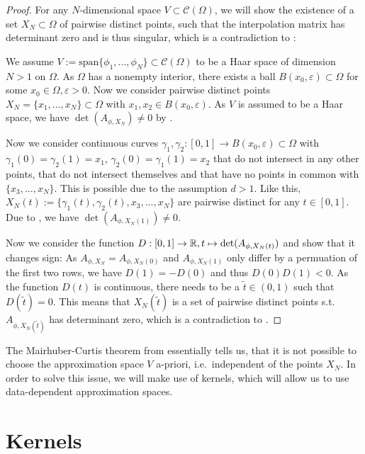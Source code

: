 \begin{proof}
For any $N$-dimensional space $V \subset \mathcal{C}(\Omega)$, we will show the existence of a set $X_N \subset \Omega$ of pairwise distinct points, 
such that the interpolation matrix has determinant zero and is thus singular, 
which is a contradiction to :

We assume $V:= \mathrm{span} \{ \phi_1, ..., \phi_N \} \subset \mathcal{C}(\Omega)$ to be a Haar space of dimension $N > 1$ on $\Omega$.
As $\Omega$ has a nonempty interior, there exists a ball $B(x_0, \varepsilon) \subset \Omega$ for some $x_0 \in \Omega, \varepsilon > 0$.
Now we consider pairwise distinct points $X_N = \{ x_1, ..., x_N \} \subset \Omega$ with $x_1, x_2 \in B(x_0, \varepsilon)$.
As $V$ is assumed to be a Haar space, we have $\det(A_{\phi, X_N}) \neq 0$ by . 

Now we consider continuous curves $\gamma_1, \gamma_2: [0, 1] \rightarrow B(x_0, \varepsilon) \subset \Omega$ with $\gamma_1(0) = \gamma_2(1) = x_1$, $\gamma_2(0) = \gamma_1(1) = x_2$ that do not intersect in any other points, 
that do not intersect themselves and that have no points in common with $\{x_3, ..., x_N\}$.
This is possible due to the assumption $d>1$.
Like this, $X_N(t) := \{ \gamma_1(t), \gamma_2(t), x_3, ..., x_N \}$ are pairwise distinct for any $t \in [0, 1]$.
Due to , we have $\det(A_{\phi, X_N(1)}) \neq 0$.

Now we consider the function $D: [0, 1] \rightarrow \mathbb{R}, t \mapsto \det(A_{\phi, X_N(t)})$ and show that it changes sign:
As $A_{\phi, X_N} = A_{\phi, X_N(0)}$ and $A_{\phi, X_N(1)}$ only differ by a permuation of the first two rows, 
we have $D(1) = -D(0)$ and thus $D(0) D(1) < 0$.
As the function $D(t)$ is continuous, there needs to be a $\tilde{t} \in (0, 1)$ such that $D(\tilde{t}) = 0$.
This means that $X_N(\tilde{t})$ is a set of pairwise distinct points s.t.\ $A_{\phi, X_N(\tilde{t})}$ has determinant zero, which is a contradiction to .
\end{proof}


The Mairhuber-Curtis theorem from  essentially tells us, 
that it is not possible to choose the approximation space $V$ a-priori, i.e.\ independent of the points $X_N$. 
In order to solve this issue, we will make use of kernels, which will allow us to use data-dependent approximation spaces.



\section{Kernels}

